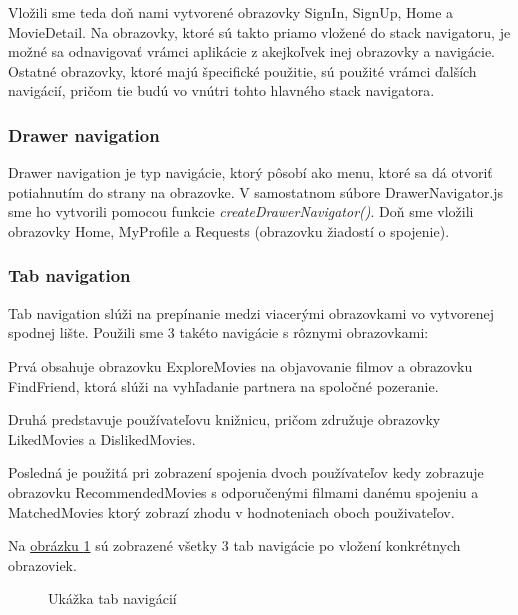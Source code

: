 Vložili sme teda doň nami vytvorené obrazovky SignIn, SignUp, Home a MovieDetail. Na obrazovky, ktoré sú takto priamo vložené do stack navigatoru, je možné sa odnavigovať vrámci aplikácie z akejkoľvek inej obrazovky a navigácie. Ostatné obrazovky, ktoré majú špecifické použitie, sú použité vrámci ďalších navigácií, pričom tie budú vo vnútri tohto hlavného stack navigatora. 
\subsubsection{Drawer navigation}
Drawer navigation je typ navigácie, ktorý pôsobí ako menu, ktoré sa dá otvoriť potiahnutím do strany na obrazovke. V samostatnom súbore DrawerNavigator.js sme ho vytvorili pomocou funkcie \textit{createDrawerNavigator()}. Doň sme vložili obrazovky Home, MyProfile a Requests (obrazovku žiadostí o spojenie).
\subsubsection{Tab navigation}
Tab navigation slúži na prepínanie medzi viacerými obrazovkami vo vytvorenej spodnej lište. Použili sme 3 takéto navigácie s rôznymi obrazovkami: 
\begin{itemize}
{\item Prvá obsahuje obrazovku ExploreMovies na objavovanie filmov a obrazovku FindFriend, ktorá slúži na vyhľadanie partnera na spoločné pozeranie. } 
{\item Druhá predstavuje používateľovu knižnicu, pričom združuje obrazovky LikedMovies a DislikedMovies.} 
{\item Posledná je použitá pri zobrazení spojenia dvoch používateľov kedy zobrazuje obrazovku RecommendedMovies s odporučenými filmami danému spojeniu a MatchedMovies ktorý zobrazí zhodu v hodnoteniach oboch použivateľov.} 
\end{itemize}

Na \hyperref[tabnav]{obrázku \ref{tabnav}} sú zobrazené všetky 3 tab navigácie po vložení konkrétnych obrazoviek.

\begin{figure}[hbt!]
  \centering   
  \def\stackalignment{c}
           \scriptsize
	\caption{Ukážka tab navigácií}  
  \label{tabnav}
\end{figure}

